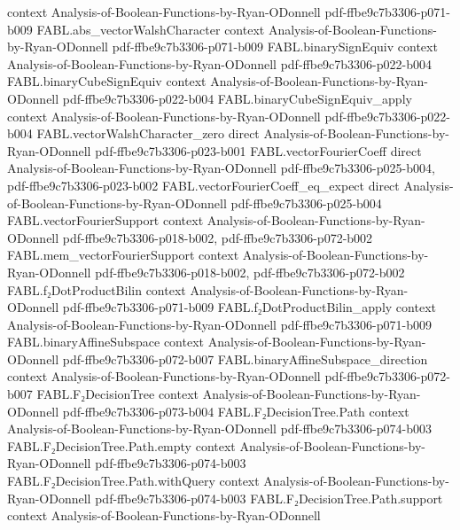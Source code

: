 \begin{theorem}
  {context}
  {Analysis-of-Boolean-Functions-by-Ryan-ODonnell}
  {pdf-ffbe9c7b3306-p071-b009}
\proofstep
  {FABL.abs_vectorWalshCharacter}
  {context}
  {Analysis-of-Boolean-Functions-by-Ryan-ODonnell}
  {pdf-ffbe9c7b3306-p071-b009}
\proofstep
  {FABL.binarySignEquiv}
  {context}
  {Analysis-of-Boolean-Functions-by-Ryan-ODonnell}
  {pdf-ffbe9c7b3306-p022-b004}
\proofstep
  {FABL.binaryCubeSignEquiv}
  {context}
  {Analysis-of-Boolean-Functions-by-Ryan-ODonnell}
  {pdf-ffbe9c7b3306-p022-b004}
\proofstep
  {FABL.binaryCubeSignEquiv_apply}
  {context}
  {Analysis-of-Boolean-Functions-by-Ryan-ODonnell}
  {pdf-ffbe9c7b3306-p022-b004}
\proofstep
  {FABL.vectorWalshCharacter_zero}
  {direct}
  {Analysis-of-Boolean-Functions-by-Ryan-ODonnell}
  {pdf-ffbe9c7b3306-p023-b001}
\proofstep
  {FABL.vectorFourierCoeff}
  {direct}
  {Analysis-of-Boolean-Functions-by-Ryan-ODonnell}
  {pdf-ffbe9c7b3306-p025-b004,
    pdf-ffbe9c7b3306-p023-b002}
\proofstep
  {FABL.vectorFourierCoeff_eq_expect}
  {direct}
  {Analysis-of-Boolean-Functions-by-Ryan-ODonnell}
  {pdf-ffbe9c7b3306-p025-b004}
\proofstep
  {FABL.vectorFourierSupport}
  {context}
  {Analysis-of-Boolean-Functions-by-Ryan-ODonnell}
  {pdf-ffbe9c7b3306-p018-b002,
    pdf-ffbe9c7b3306-p072-b002}
\proofstep
  {FABL.mem_vectorFourierSupport}
  {context}
  {Analysis-of-Boolean-Functions-by-Ryan-ODonnell}
  {pdf-ffbe9c7b3306-p018-b002,
    pdf-ffbe9c7b3306-p072-b002}
\proofstep
  {FABL.f₂DotProductBilin}
  {context}
  {Analysis-of-Boolean-Functions-by-Ryan-ODonnell}
  {pdf-ffbe9c7b3306-p071-b009}
\proofstep
  {FABL.f₂DotProductBilin_apply}
  {context}
  {Analysis-of-Boolean-Functions-by-Ryan-ODonnell}
  {pdf-ffbe9c7b3306-p071-b009}
\proofstep
  {FABL.binaryAffineSubspace}
  {context}
  {Analysis-of-Boolean-Functions-by-Ryan-ODonnell}
  {pdf-ffbe9c7b3306-p072-b007}
\proofstep
  {FABL.binaryAffineSubspace_direction}
  {context}
  {Analysis-of-Boolean-Functions-by-Ryan-ODonnell}
  {pdf-ffbe9c7b3306-p072-b007}
\proofstep
  {FABL.F₂DecisionTree}
  {context}
  {Analysis-of-Boolean-Functions-by-Ryan-ODonnell}
  {pdf-ffbe9c7b3306-p073-b004}
\proofstep
  {FABL.F₂DecisionTree.Path}
  {context}
  {Analysis-of-Boolean-Functions-by-Ryan-ODonnell}
  {pdf-ffbe9c7b3306-p074-b003}
\proofstep
  {FABL.F₂DecisionTree.Path.empty}
  {context}
  {Analysis-of-Boolean-Functions-by-Ryan-ODonnell}
  {pdf-ffbe9c7b3306-p074-b003}
\proofstep
  {FABL.F₂DecisionTree.Path.withQuery}
  {context}
  {Analysis-of-Boolean-Functions-by-Ryan-ODonnell}
  {pdf-ffbe9c7b3306-p074-b003}
\proofstep
  {FABL.F₂DecisionTree.Path.support}
  {context}
  {Analysis-of-Boolean-Functions-by-Ryan-ODonnell}

\end{theorem}
